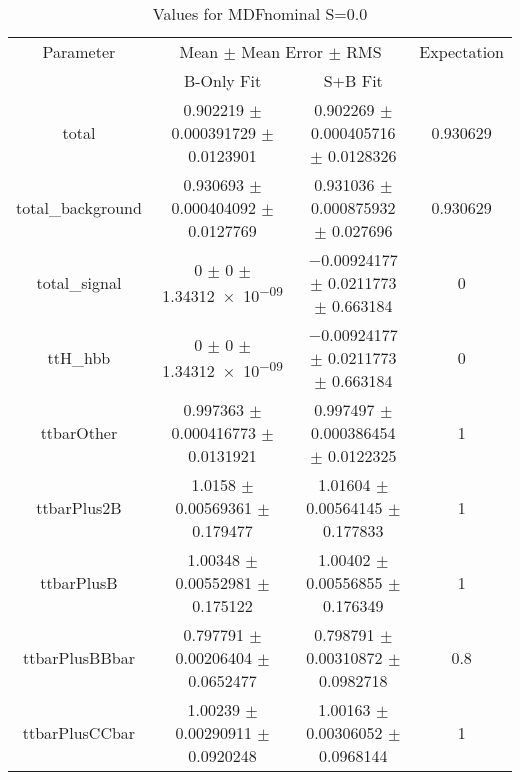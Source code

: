 \begin{table}
\centering
\caption{Values for MDFnominal S=0.0}
\begin{tabular}{cccc}
\toprule
Parameter & \multicolumn{2}{c}{Mean $\pm$ Mean Error $\pm$ RMS} & Expectation\\
 & B-Only Fit & S+B Fit & \\
\midrule
total & \num{0.902219} $\pm$ \num{0.000391729} $\pm$ \num{0.0123901} & \num{0.902269} $\pm$ \num{0.000405716} $\pm$ \num{0.0128326} & \num{0.930629}\\
total\_background & \num{0.930693} $\pm$ \num{0.000404092} $\pm$ \num{0.0127769} & \num{0.931036} $\pm$ \num{0.000875932} $\pm$ \num{0.027696} & \num{0.930629}\\
total\_signal & \num{0} $\pm$ \num{0} $\pm$ \num{1.34312e-09} & \num{-0.00924177} $\pm$ \num{0.0211773} $\pm$ \num{0.663184} & \num{0}\\
ttH\_hbb & \num{0} $\pm$ \num{0} $\pm$ \num{1.34312e-09} & \num{-0.00924177} $\pm$ \num{0.0211773} $\pm$ \num{0.663184} & \num{0}\\
ttbarOther & \num{0.997363} $\pm$ \num{0.000416773} $\pm$ \num{0.0131921} & \num{0.997497} $\pm$ \num{0.000386454} $\pm$ \num{0.0122325} & \num{1}\\
ttbarPlus2B & \num{1.0158} $\pm$ \num{0.00569361} $\pm$ \num{0.179477} & \num{1.01604} $\pm$ \num{0.00564145} $\pm$ \num{0.177833} & \num{1}\\
ttbarPlusB & \num{1.00348} $\pm$ \num{0.00552981} $\pm$ \num{0.175122} & \num{1.00402} $\pm$ \num{0.00556855} $\pm$ \num{0.176349} & \num{1}\\
ttbarPlusBBbar & \num{0.797791} $\pm$ \num{0.00206404} $\pm$ \num{0.0652477} & \num{0.798791} $\pm$ \num{0.00310872} $\pm$ \num{0.0982718} & \num{0.8}\\
ttbarPlusCCbar & \num{1.00239} $\pm$ \num{0.00290911} $\pm$ \num{0.0920248} & \num{1.00163} $\pm$ \num{0.00306052} $\pm$ \num{0.0968144} & \num{1}\\
\bottomrule
\end{tabular}
\end{table}